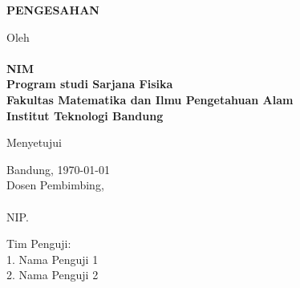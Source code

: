 \newpage
\begin{center}
\begin{doublespace}
\textbf{\Large \MakeUppercase{pengesahan}}
\end{doublespace}
\end{center}

\begin{center}
\begin{doublespace}
\textbf{\Large\MakeUppercase {\judul}}
\end{doublespace}
\end{center}

\begin{center}
Oleh\\
\textbf{\penulis}\\
\textbf{NIM \nim}\\[1.5cm]

\textbf{Program studi Sarjana Fisika\\
Fakultas Matematika dan Ilmu Pengetahuan Alam\\
Institut Teknologi Bandung}\\[1cm]
\vfill

Menyetujui\\[1cm]
\end{center}


\begin{center}
    Bandung, \today\\
    Dosen Pembimbing, \\[2cm]
    \pembimbingsatu\\
    NIP. \NIPpbbsatu
\end{center}

\vfill
Tim Penguji:\\
1. Nama Penguji 1\\
2. Nama Penguji 2